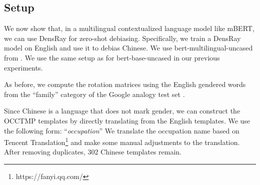 \subsection{Setup}
We now show that, in a multilingual contextualized language
model like mBERT,
we can use DensRay  for zero-shot debiasing.
Specifically, we train a DensRay model on English and use it
to debias Chinese.
We use  bert-multilingual-uncased from
. We  use the same setup as
for bert-base-uncased in our previous experiments. 

As before, we compute the rotation matrices using the English gendered words from the ``family'' category of the Google analogy test set .

Since Chinese is a language that does not mark gender, we
can construct the OCCTMP templates by directly translating
from the English templates. We use the following form:
``\text{[MASK]}\textit{occupation}''
We translate the occupation name based on
Tencent
Translation\footnote{https://fanyi.qq.com/} and make some
manual adjustments to the translation. After removing 
duplicates,  302 Chinese templates remain.

